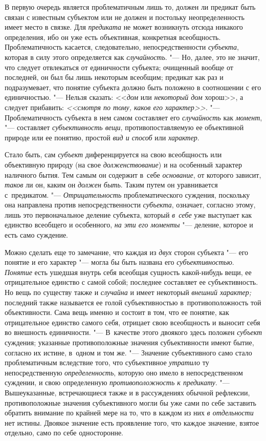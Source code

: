 \label{bkm:bm66a}В первую очередь является проблематичным лишь
то, должен ли предикат быть связан с известным субъектом или не должен и
постольку неопределенность имеет место в связке. Для {\em предиката} не может
возникнуть отсюда никакого определения, ибо он уже есть объективная,
конкретная всеобщность. Проблематичность касается, следовательно,
непосредственности {\em субъекта}, которая в силу этого определяется как
{\em случайность}. "--- Но,
далее, это не значит, что следует отвлекаться от единичности субъекта;
очищенный вообще от последней, он был бы лишь некоторым всеобщим; предикат
как раз и подразумевает, что понятие субъекта должно быть положено в
соотношении с его единичностью. "--- Нельзя сказать: <<{\em дом} или
{\em некоторый дом} хорош>>, а следует прибавить: {\em <<смотря по тому,
каков его характер>>.} "--- Проблематичность субъекта в нем самом
составляет его {\em случайность} как {\em момент}, "--- составляет
{\em субъективность вещи}, противопоставляемую ее объективной природе
или ее понятию, простой {\em вид и способ} или {\em характер}.

Стало быть, сам {\em субъект} диференцируется на свою всеобщность или
объективную природу (на свое {\em долженствование})
и на особенный характер наличного бытия. Тем самым он
содержит в~себе {\em основание}, от которого зависит, {\em таков} ли он,
каким он {\em должен быть}. Таким путем он уравнивается
с~предикатом. "--- {\em Отрицательность} проблематического суждения,
поскольку она направлена против непосредственности {\em субъекта},
означает, согласно этому, лишь это первоначальное деление субъекта,
который {\em в~себе} уже выступает как единство всеобщего и особенного,
{\em на эти его моменты} "--- деление, которое и есть само суждение.

Можно сделать еще то замечание, что каждая из {\em двух} сторон
субъекта "--- его понятие и его характер "--- могла бы быть названа его
{\em субъективностью}. \label{bkm:bm01a}{\em Понятие}
есть ушедшая внутрь себя всеобщая сущность какой-нибудь вещи,
ее отрицательное единство с самой собой; последнее составляет ее
субъективность. Но вещь по существу также и {\em случайна} и имеет некоторый
{\em внешний характер;} последний также называется ее голой субъективностью
в~противоположность той объективности. Сама вещь именно и состоит в том, что
ее понятие, как отрицательное единство самого себя, отрицает свою
всеобщность и выносит себя во внешность
единичности. "--- В~качестве этого двоякого здесь положен {\em субъект}
суждения; указанные противоположные значения субъективности имеют бытие,
согласно их истине, в~одном и том же. "--- Значение субъективного само
стало проблематичным вследствие того, что субъективное {\em утратило} ту
непосредственную {\em определенность}, которую оно имело в непосредственном
суждении, и свою определенную {\em противоположность к
предикату}. "--- Вышеуказанные, встречающиеся также и
в рассуждениях обычной рефлексии, противоположные значения субъективного
могли бы уже сами по себе заставить обратить внимание по крайней мере на
то, что в каждом из них {\em в отдельности} нет истины. Двоякое значение
есть проявление того, что каждое значение, взятое отдельно, само по себе
односторонне.

